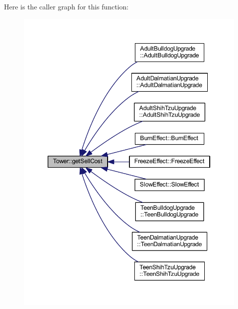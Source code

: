Here is the caller graph for this function\+:\nopagebreak
\begin{figure}[H]
\begin{center}
\leavevmode
\includegraphics[width=346pt]{class_tower_adae75d4203ca7c3a92da1fe367d64bac_icgraph}
\end{center}
\end{figure}


